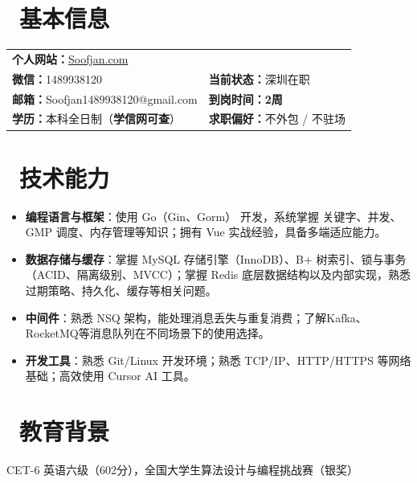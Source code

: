 \documentclass{resume}
\begin{document}


\section{\faInfoCircle\ 基本信息}
\vspace{0.5ex} %
\begin{center}
\begin{tabular}{p{} p{}}
    \textbf{个人网站：}\href{https://Soofjan.com}{Soofjan.com}\\
    
    \textbf{微信：}1489938120          & \textbf{当前状态：}深圳在职 \\
    \textbf{邮箱：}Soofjan1489938120@gmail.com & \textbf{到岗时间：}\textbf{2周} \\
    \textbf{学历：}本科全日制（\textbf{学信网可查}） & \textbf{求职偏好：}不外包 / 不驻场 \\
\end{tabular}
\end{center}

\section{\faCogs\ 技术能力}
\begin{itemize}[parsep=0.3ex]
    \item \textbf{编程语言与框架}：使用 Go（Gin、Gorm） 开发，系统掌握 关键字、并发、GMP 调度、内存管理等知识；拥有 Vue 实战经验，具备多端适应能力。
    \item \textbf{数据存储与缓存}：掌握 MySQL 存储引擎（InnoDB）、B+ 树索引、锁与事务（ACID、隔离级别、MVCC）；掌握 Redis 底层数据结构以及内部实现，熟悉过期策略、持久化、缓存等相关问题。
    \item \textbf{中间件}：熟悉 NSQ 架构，能处理消息丢失与重复消费；了解Kafka、RocketMQ等消息队列在不同场景下的使用选择。
    \item \textbf{开发工具}：熟悉 Git/Linux 开发环境；熟悉 TCP/IP、HTTP/HTTPS 等网络基础；高效使用 Cursor AI 工具。
\end{itemize}

\section{\faGraduationCap\ 教育背景}
CET-6 英语六级（602分），全国大学生算法设计与编程挑战赛（银奖）
\end{document}
